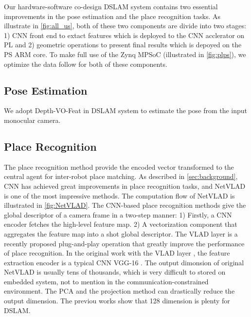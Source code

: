 \label{sec:hardsoft}
Our hardware-software co-design DSLAM system contains two essential improvements in the pose estimation and the place recognition tasks. As illustrate in \cref{fig:all_us}, both of these two components are divide into two stages: 1) CNN front end to extact features which is deployed to the CNN acclerator on PL and 2) geometric operations to present final results which is depoyed on the PS ARM core. To make full use of the Zynq MPSoC (illustrated in \cref{fig:plps}), we optimize the data follow for both of these components.

\subsection{Pose Estimation}
We adopt Depth-VO-Feat \cite{Zhan:2018e92} in DSLAM system to estimate the pose from the input monocular camera.

\subsection{Place Recognition}
The place recognition method provide the encoded vector transformed to the central agent for inter-robot place matching. As described in \cref{sec:background}, CNN has achieved great improvements in place recognition tasks, and NetVLAD \cite{Arandjelovic:2017997} is one of the most impressive methods. The computation flow of NetVLAD is illustrated in \cref{fig:NetVLAD}. The CNN-based place recognition methods give the global descriptor of a camera frame in a two-step manner: 1) Firstly, a CNN encoder fetches the high-level feature map. 2) A vectorization component that aggregates the feature map into a shot global descriptor. The VLAD layer \cite{Arandjelovic:2017997} is a recently proposed plug-and-play operation that greatly improve the performance of place recognition. In the original work with the VLAD layer \cite{Arandjelovic:2017997}, the feature extraction encoder is a typical CNN VGG-16 \cite{Simonyan:20143be}. The output dimonsion of original NetVLAD is usually tens of thousands, which is very difficult to stored on embedded system, not to mention in the communication-constrained environment. The PCA and the projection method can drastically reduce the output dimension. The previou works\cite{Cieslewski:20187ee} show that 128 dimension is plenty for DSLAM.


